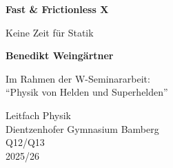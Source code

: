 \begin{titlepage}
	
	\begin{center}
		\thispagestyle{empty}
		
		\vspace*{1cm}
		
		\Huge
		\textbf{Fast \& Frictionless X}
		
		\vspace{0.5cm}
		\LARGE
		Keine Zeit für Statik
		
		\vspace{1.5cm}
		
		\textbf{Benedikt Weingärtner}
		
		\vfill
		
		Im Rahmen der W-Seminararbeit:\\
		\enquote{Physik von Helden und Superhelden}
		
		\vspace{0.8cm}
		
		
		\Large
		Leitfach Physik\\
		Dientzenhofer Gymnasium Bamberg\\
		Q12/Q13\\
		2025/26
		
	\end{center}
\end{titlepage}